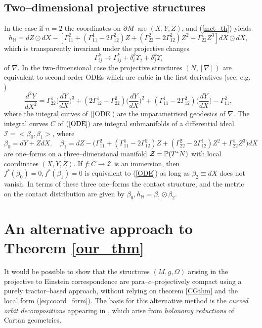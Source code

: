 \subsection{Two--dimensional projective structures}
In the case if $n=2$ the coordinates on $\partial M$ are $(X, Y, Z)$,  and (\ref{met_th}) yields
\[
h_{ \mathbb{H} }=dZ\odot dX-[\Gamma_{11}^2+(\Gamma_{11}^1-2\Gamma_{12}^2)Z+(\Gamma_{22}^2-2\Gamma_{12}^2)Z^2+
\Gamma_{22}^1Z^3]dX\odot dX,
\]
which is transparently invariant under the projective changes 
\[
\Gamma_{ij}^k\longrightarrow \Gamma_{ij}^k+\delta^k_i\Upsilon_j+\delta^k_j\Upsilon_i
\]
of $\nabla$.
In the  two-dimensional case the 
projective
structures $(N, [\nabla])$ are equivalent to second order ODEs which are cubic in
the first derivatives (see, e.g. \cite{BDE})
\begin{equation}
\label{ODE}
\frac{d^2 Y}{d X^2}=\Gamma^1_{22}\Big(\frac{d Y}{d X}\Big)^3
+(2\Gamma^1_{12}-\Gamma^2_{22})\Big(\frac{d Y}{d X}\Big)^2
+(\Gamma^1_{11}-2\Gamma^2_{12})\Big(\frac{d Y}{d X}\Big)-
\Gamma^2_{11},
\end{equation}
where the integral curves of (\ref{ODE}) are the unparametrised geodesics of $\nabla$. 
The integral curves $C$ of $(\ref{ODE})$ are integral submanifolds
of a  differential
ideal ${\mathcal I}=<\beta_0, \beta_1>$, where
\[
\beta_0=dY+ZdX, \quad \beta_1=dZ-\Big(\Gamma_{11}^2+(\Gamma_{11}^1-2\Gamma_{12}^2)Z+(\Gamma_{22}^2-2\Gamma_{12}^1)Z^2+
\Gamma_{22}^1Z^3\Big)dX
\]
are one--forms on a three--dimensional manifold $\mathcal{Z}=\mathbb{P}(T^*N)$ with local coordinates $(X, Y, Z)$. If $f:C\rightarrow \mathcal{Z}$ is an immersion, then $f^*(\beta_0)=0, f^*(\beta_1)=0$ is equivalent
to (\ref{ODE}) as long as $\beta_2\equiv dX$ does not vanish. In terms of these three one--forms
the contact structure, and the metric on the contact distribution are given by
$
\beta_0,  h_{ \mathbb{H} }=\beta_1\odot\beta_2.
$

\section{An alternative approach to Theorem \ref{our_thm}}

It would be possible to show that the structures $(M,g,\Omega)$ arising in the projective to Einstein correspondence are para--$c$--projectively compact using a purely tractor--based approach, without relying on theorem \ref{CGthm} and the local form (\ref{eq:coord_form}). The basis for this alternative method is the \textit{curved orbit decompositions} appearing in \cite{CGH-duke}, which arise from \textit{holonomy reductions} of Cartan geometries.

